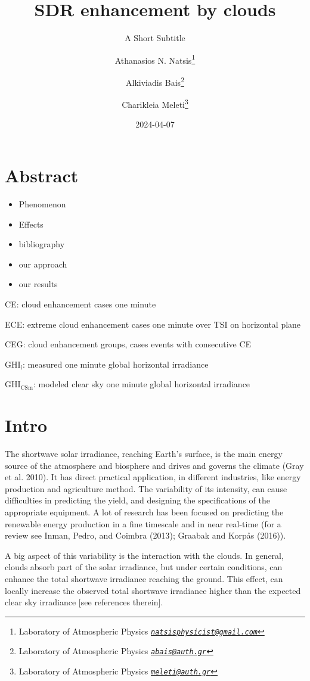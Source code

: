 \documentclass[
]{article}
\title{SDR enhancement by clouds}
\subtitle{A Short Subtitle}
\author{Athanasios N. Natsis\footnote{Laboratory of Atmospheric Physics \emph{\href{mailto:natsisphysicist@gmail.com}{\nolinkurl{natsisphysicist@gmail.com}}}} \and Alkiviadis Bais\footnote{Laboratory of Atmospheric Physics \emph{\href{mailto:abais@auth.gr}{\nolinkurl{abais@auth.gr}}}} \and Charikleia Meleti\footnote{Laboratory of Atmospheric Physics \emph{\href{mailto:meleti@auth.gr}{\nolinkurl{meleti@auth.gr}}}}}
\date{2024-04-07}
\providecommand{\tightlist}{%
  \setlength{\itemsep}{0pt}\setlength{\parskip}{0pt}}
\begin{document}
\maketitle

{
\setcounter{tocdepth}{4}
\tableofcontents
}
\hypertarget{abstract}{%
\section*{Abstract}\label{abstract}}

\begin{itemize}
\tightlist
\item
  Phenomenon
\item
  Effects
\item
  bibliography
\item
  our approach
\item
  our results
\end{itemize}

CE: cloud enhancement cases one minute

ECE: extreme cloud enhancement cases one minute over TSI on horizontal plane

CEG: cloud enhancement groups, cases events with consecutive CE

\(\text{GHI}_\text{i}\): measured one minute global horizontal irradiance

\(\text{GHI}_\text{CSm}\): modeled clear sky one minute global horizontal irradiance

\hypertarget{intro}{%
\section{Intro}\label{intro}}

The shortwave solar irradiance, reaching Earth's surface, is the main energy source
of the atmosphere and biosphere and drives and governs the climate (Gray et al. 2010). It
has direct practical application, in different industries, like energy production and
agriculture method. The variability of its intensity, can cause difficulties in
predicting the yield, and designing the specifications of the appropriate equipment.
A lot of research has been focused on predicting the renewable energy production in a
fine timescale and in near real-time (for a review see Inman, Pedro, and Coimbra (2013); Graabak and Korpås (2016)).

A big aspect of this variability is the interaction with the clouds. In general,
clouds absorb part of the solar irradiance, but under certain conditions, can enhance
the total shortwave irradiance reaching the ground. This effect, can locally increase
the observed total shortwave irradiance higher than the expected clear sky irradiance
{[}see references therein{]}.
\end{document}
